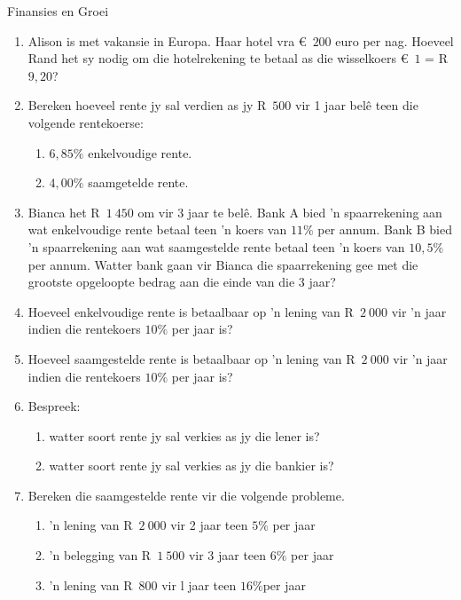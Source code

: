 \begin{eocexercises}{Finansies en Groei}
    \begin{enumerate}[label=\textbf{\arabic*}.]
	\item Alison is met vakansie in Europa. Haar hotel vra €~$200$ euro per nag. Hoeveel Rand het sy nodig om die hotelrekening te betaal as die wisselkoers  €~$1$ = R~$9,20$?

	\item Bereken hoeveel rente jy sal verdien as jy R~$500$ vir 1 jaar belê teen die volgende rentekoerse:
	\begin{enumerate}
	    \item $6,85\%$ enkelvoudige rente.
	    \item $4,00\%$ saamgetelde rente.
	\end{enumerate}

	\item Bianca het R~$1~450$ om vir 3 jaar te belê. Bank A bied ’n spaarrekening aan wat enkelvoudige rente betaal
teen ’n koers van $11\%$ per annum. Bank B bied ’n spaarrekening aan wat saamgestelde rente betaal
teen ’n koers van $10,5\%$ per annum. Watter bank gaan vir Bianca die spaarrekening gee met die grootste
opgeloopte bedrag aan die einde van die 3 jaar?

	\item Hoeveel enkelvoudige rente is betaalbaar op ’n lening van R~$2~000$ vir ’n jaar indien die rentekoers $10\%$ per jaar is?

	\item Hoeveel saamgestelde rente is betaalbaar op ’n lening van  R~$2~000$ vir ’n jaar indien die rentekoers $10\%$ per jaar is?

	\item Bespreek:
	\begin{enumerate}
	    \item watter soort rente jy sal verkies as jy die lener is?

	    \item watter soort rente jy sal verkies as jy die bankier is?
	\end{enumerate}

	\item Bereken die saamgestelde rente vir die volgende probleme.
	\begin{enumerate}
	    \item ’n lening van R~$2~000$ vir 2 jaar teen  $5\%$ per jaar
	    \item ’n belegging van  R~$1~500$ vir 3 jaar teen $6\%$ per jaar
	    \item ’n lening van R~$800$ vir l jaar teen $16\%$per jaar
	\end{enumerate}


\end{enumerate}
\end{eocexercises}
